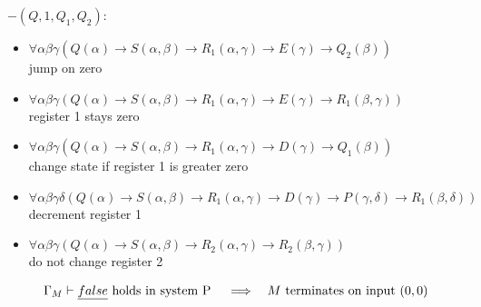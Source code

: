 $-(Q,1,Q_1,Q_2):$
\begin{itemize}
	\item $\forall\alpha\beta\gamma(Q(\alpha)\to S(\alpha,\beta)\to R_1(\alpha,\gamma)\to E(\gamma)\to Q_2(\beta))$\\jump on zero
	\item $\forall\alpha\beta\gamma(Q(\alpha)\to S(\alpha,\beta)\to R_1(\alpha,\gamma)\to E(\gamma)\to R_1(\beta,\gamma))$\\register 1 stays zero
	\item $\forall\alpha\beta\gamma(Q(\alpha)\to S(\alpha,\beta)\to R_1(\alpha,\gamma)\to D(\gamma)\to Q_1(\beta))$\\change state if register 1 is greater zero
	\item $\forall\alpha\beta\gamma\delta(Q(\alpha)\to S(\alpha,\beta)\to R_1(\alpha,\gamma)\to D(\gamma) \to P(\gamma,\delta)\to R_1(\beta,\delta))$\\decrement register 1
	\item $\forall\alpha\beta\gamma(Q(\alpha)\to S(\alpha,\beta)\to R_2(\alpha,\gamma)\to R_2(\beta,\gamma))$\\do not change register 2
\end{itemize}
\begin{claim}\label{cla.17}
	\begin{align*}
		  & \text{$\Gamma_M\vdash\emph{false}$ holds in system P} &   & \implies & \text{$M$ terminates on input $(0,0)$} 
	\end{align*}
\end{claim}
